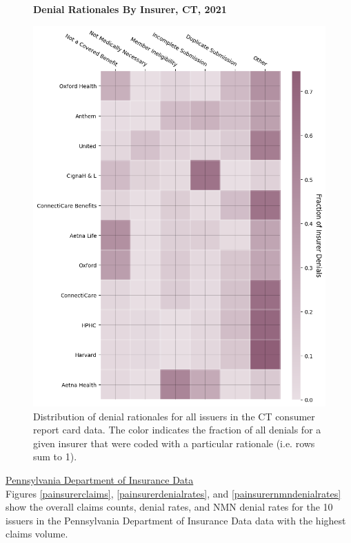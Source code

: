 \documentclass[12pt, a4paper,twoside]{report}
\theoremstyle{plain} %
\theoremstyle{definition} %
\theoremstyle{remark} %
\numberwithin{equation}{chapter}
\begin{document}
		
		\begin{figure}[h!]
			\centering
			\textbf{Denial Rationales By Insurer, CT, 2021}\par\medskip
			\includegraphics[width=\columnwidth]{images/ct_claims/insurer_vs_denial_cat.png}
			\caption{Distribution of denial rationales for all issuers in the CT consumer report card data. The color indicates the fraction of all denials for a given insurer that were coded with a particular rationale (i.e. rows sum to 1).}
			\label{ctdenialrationalesbyinsurer}
		\end{figure}
		
		\clearpage
		
		
		\underline{Pennsylvania Department of Insurance Data} \\
		
		
		Figures \ref{painsurerclaims}, \ref{painsurerdenialrates}, and \ref{painsurernmndenialrates} show the overall claims counts, denial rates, and NMN denial rates for the 10 issuers in the Pennsylvania Department of Insurance Data data with the highest claims volume.
	
\end{document}
